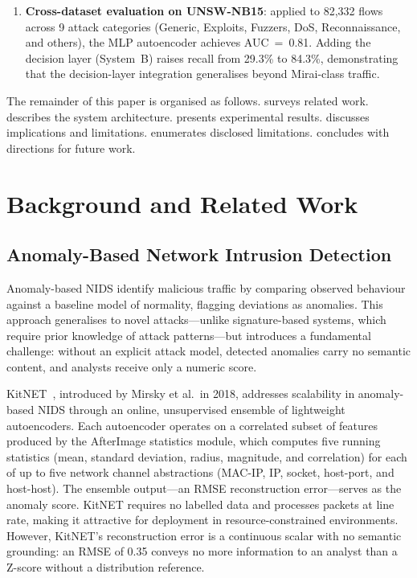 \documentclass[preprint,12pt,authoryear]{elsarticle}
\begin{document}
\begin{enumerate}
\item \textbf{Cross-dataset evaluation on UNSW-NB15}: applied to 82{,}332
  flows across 9 attack categories (Generic, Exploits, Fuzzers, DoS,
  Reconnaissance, and others), the MLP autoencoder achieves AUC~=~0.81.
  Adding the decision layer (System~B) raises recall from 29.3\% to 84.3\%,
  demonstrating that the decision-layer integration generalises beyond
  Mirai-class traffic.
\end{enumerate}

The remainder of this paper is organised as follows. 
surveys related work.  describes the system architecture.
 presents experimental results. 
discusses implications and limitations.  enumerates
disclosed limitations.  concludes with directions for
future work.

\section{Background and Related Work}
\label{sec:background}

\subsection{Anomaly-Based Network Intrusion Detection}
\label{subsec:anomaly_nids}

Anomaly-based NIDS identify malicious traffic by comparing observed behaviour
against a baseline model of normality, flagging deviations as anomalies. This
approach generalises to novel attacks---unlike signature-based systems, which
require prior knowledge of attack patterns---but introduces a fundamental
challenge: without an explicit attack model, detected anomalies carry no
semantic content, and analysts receive only a numeric score.

KitNET~\citep{Mirsky2018}, introduced by Mirsky et al.\ in 2018, addresses
scalability in anomaly-based NIDS through an online, unsupervised ensemble of
lightweight autoencoders. Each autoencoder operates on a correlated subset of
features produced by the AfterImage statistics module, which computes five
running statistics (mean, standard deviation, radius, magnitude, and
correlation) for each of up to five network channel abstractions (MAC-IP, IP,
socket, host-port, and host-host). The ensemble output---an RMSE reconstruction
error---serves as the anomaly score. KitNET requires no labelled data and
processes packets at line rate, making it attractive for deployment in
resource-constrained environments. However, KitNET's reconstruction error is a
continuous scalar with no semantic grounding: an RMSE of 0.35 conveys no more
information to an analyst than a Z-score without a distribution reference.
\end{document}
